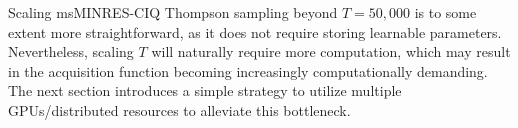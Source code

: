 Scaling msMINRES-CIQ Thompson sampling beyond $T=50,\!000$ is to some extent more straightforward, as it does not require storing learnable parameters.
Nevertheless, scaling $T$ will naturally require more computation, which may result in the acquisition function becoming increasingly computationally demanding.
The next section introduces a simple strategy to utilize multiple GPUs/distributed resources to alleviate this bottleneck.
